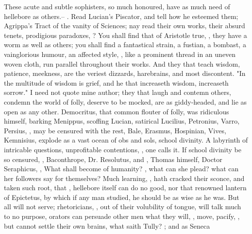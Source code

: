 These acute and subtle sophisters, so much honoured, have
as much need of hellebore as others.-- . Read Lucian's Piscator, and
tell how he esteemed them; Agrippa's Tract of the vanity of Sciences; nay read
their own works, their absurd tenets, prodigious paradoxes, ? You shall find that of Aristotle true, , they have a worm as well as others; you shall
find a fantastical strain, a fustian, a bombast, a vainglorious humour, an
affected style, \etc{}, like a prominent thread in an uneven woven cloth, run
parallel throughout their works. And they that teach wisdom, patience,
meekness, are the veriest dizzards, harebrains, and most discontent.
"In the multitude of wisdom is grief, and he that
increaseth wisdom, increaseth sorrow." I need not quote mine author; they that
laugh and contemn others, condemn the world of folly, deserve to be mocked, are
as giddy-headed, and lie as open as any other. Democritus,
that common flouter of folly, was ridiculous himself, barking Menippus,
scoffing Lucian, satirical Lucilius, Petronius, Varro, Persius, \etc{}, may be
censured with the rest,  Bale,
Erasmus, Hospinian, Vives, Kemnisius, explode as a vast ocean of obs and sols,
school divinity. A labyrinth of intricable questions,
unprofitable contentions, , one calls it. If
school divinity be so censured, , \etc{} Baconthrope, Dr. Resolutus, and ,
Thomas himself, Doctor Seraphicus, , \etc{} What shall become of humanity? , what can she
plead? what can her followers say for themselves? Much learning,
, hath cracked their sconce, and
taken such root, that , hellebore itself
can do no good, nor that renowned lantern of Epictetus, by
which if any man studied, he should be as wise as he was. But all will not
serve; rhetoricians, , out of
their volubility of tongue, will talk much to no purpose, orators can persuade
other men what they will, , move, pacify, \etc{},
but cannot settle their own brains, what saith Tully? ; and as Seneca
